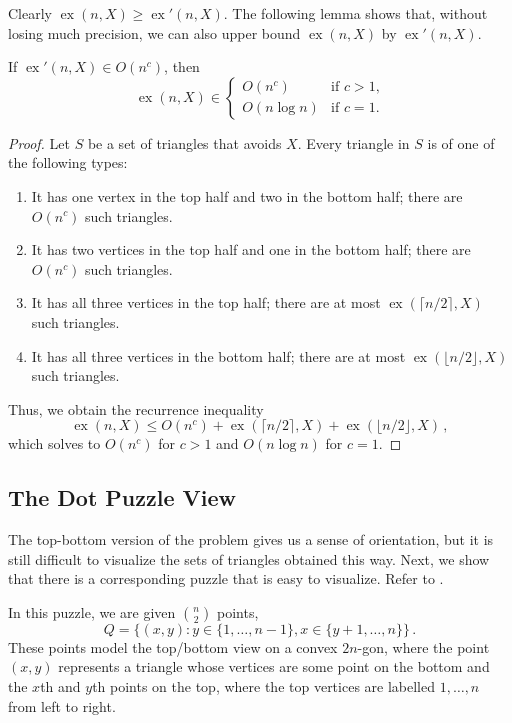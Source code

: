 \documentclass{patmorin}
\newcommand{\borisspace}{\,}
\DeclareMathOperator{\ex}{ex}
\begin{document}
Clearly $\ex(n,X)\ge\ex'(n,X)$.  The following lemma shows that, without
losing much precision, we can also upper bound $\ex(n,X)$ by $\ex'(n,X)$.

\begin{lem}
  If $\ex'(n,X)\in O(n^c)$, then
  \[
     \ex(n,X)\in 
        \begin{cases} 
            O(n^c)     & \text{if $c>1$,} \\
            O(n\log n) & \text{if $c=1$.}
        \end{cases}
  \]
\end{lem}

\begin{proof}
   Let $S$ be a set of triangles that avoids $X$.  Every triangle in $S$
   is of one of the following types:
   \begin{enumerate}
      \item It has one vertex in the top half and two in the bottom half;
        there are $O(n^{c})$ such triangles.
      \item It has two vertices in the top half and one in the bottom
        half; there are $O(n^{c})$ such triangles.
      \item It has all three vertices in the top half; there are at most
        $\ex(\lceil n/2\rceil,X)$ such triangles.
      \item It has all three vertices in the bottom half; there are at
        most $\ex(\lfloor n/2\rfloor,X)$ such triangles.
   \end{enumerate}
   Thus, we obtain the recurrence inequality
   \[  \ex(n,X) \le O(n^{c}) + \ex(\lceil n/2\rceil,X) + \ex(\lfloor n/2\rfloor,X) \borisspace ,\]
   which solves to $O(n^c)$ for $c>1$ and $O(n\log n)$ for $c=1$.
\end{proof}


\subsection{The Dot Puzzle View}

The top-bottom version of the problem gives us a sense of orientation,
but it is still difficult to visualize the sets of triangles obtained
this way. Next, we show that there is a corresponding puzzle that is
easy to visualize.  Refer to .  

In this puzzle, we are given $\binom{n}{2}$ points,
\[
    Q = \{(x,y): y\in\{1,\ldots,n-1\}, x\in\{y+1,\ldots,n\} \} \borisspace .
\]
These points model the top/bottom view on a convex $2n$-gon, where the
point $(x,y)$ represents a triangle whose vertices are some point on
the bottom and the $x$th and $y$th points on the top, where the top
vertices are labelled $1,\ldots,n$ from left to right.
\end{document}
